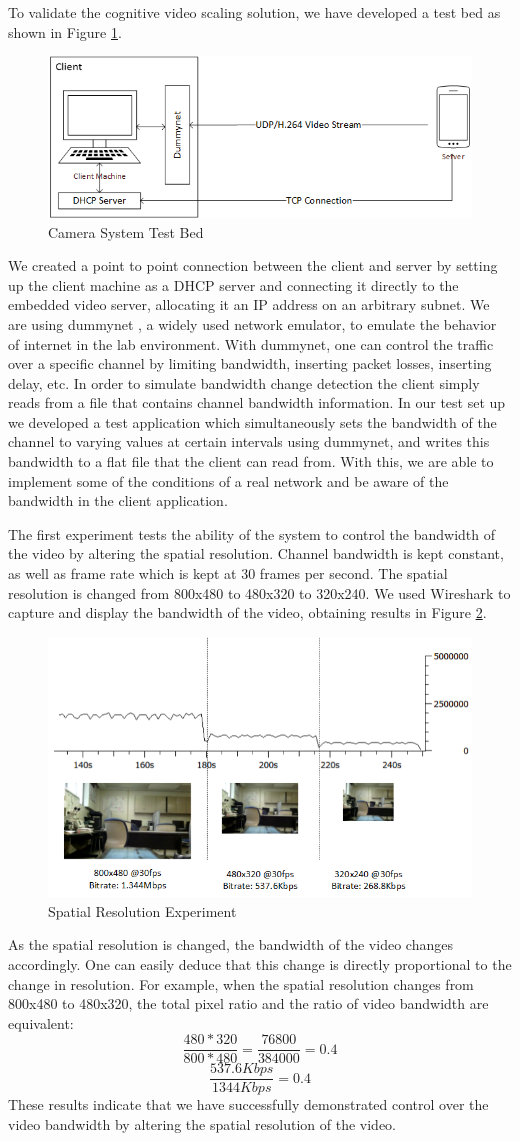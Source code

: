 \documentclass[a4paper,12pt]{article}
\begin{document}
To validate the cognitive video scaling solution, we have developed a test bed as shown in Figure \ref{fig:Testbed}.
\begin{figure}[h]
\centering
\includegraphics[width=0.5\linewidth]{CameraSystemTestbed.png}
\caption{Camera System Test Bed}
\label{fig:Testbed}
\end{figure}
We created a point to point connection between the client and server by setting up the client machine as a DHCP server and connecting it directly to the embedded video server, allocating it an IP address on an arbitrary subnet. We are using dummynet , a widely used network emulator, to emulate the behavior of internet in the lab environment. With dummynet, one can control the traffic over a specific channel by limiting bandwidth, inserting packet losses, inserting delay, etc. In order to simulate bandwidth change detection the client simply reads from a file that contains channel bandwidth information. In our test set up we developed a test application which simultaneously sets the bandwidth of the channel to varying values at certain intervals using dummynet, and writes this bandwidth to a flat file that the client can read from. With this, we are able to implement some of the conditions of a real network and be aware of the bandwidth in the client application. 

The first experiment tests the ability of the system to control the bandwidth of the video by altering the spatial resolution. Channel bandwidth is kept constant, as well as frame rate which is kept at 30 frames per second. The spatial resolution is changed from 800x480 to 480x320 to 320x240. We used Wireshark to capture and display the bandwidth of the video, obtaining results in Figure \ref{fig:SpatialTest}.
\begin{figure}[h]
\centering
\includegraphics[width=0.5\linewidth]{SpatialResolutionTest.png}
\caption{Spatial Resolution Experiment}
\label{fig:SpatialTest}
\end{figure}
As the spatial resolution is changed, the bandwidth of the video changes accordingly. One can easily deduce that this change is directly proportional to the change in resolution. For example, when the spatial resolution changes from 800x480 to 480x320, the total pixel ratio and the ratio of video bandwidth are equivalent:
\[ \frac{480 * 320}{800 * 480} = \frac{76800}{384000} = 0.4 \]
\[ \frac{537.6Kbps}{1344Kbps} = 0.4 \]
These results indicate that we have successfully demonstrated control over the video bandwidth by altering the spatial resolution of the video. 
\end{document}
